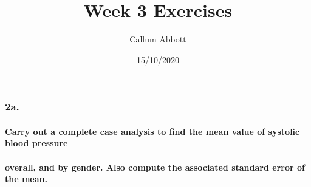 \documentclass[
]{article}
\title{Week 3 Exercises}
\author{Callum Abbott}
\date{15/10/2020}
\begin{document}
\maketitle

\hypertarget{a.}{%
\subsubsection{2a.}\label{a.}}

\hypertarget{carry-out-a-complete-case-analysis-to-find-the-mean-value-of-systolic-blood-pressure}{%
\paragraph{Carry out a complete case analysis to find the mean value of
systolic blood
pressure}\label{carry-out-a-complete-case-analysis-to-find-the-mean-value-of-systolic-blood-pressure}}

\hypertarget{overall-and-by-gender.-also-compute-the-associated-standard-error-of-the-mean.}{%
\paragraph{overall, and by gender. Also compute the associated standard
error of the
mean.}\label{overall-and-by-gender.-also-compute-the-associated-standard-error-of-the-mean.}}
\end{document}
